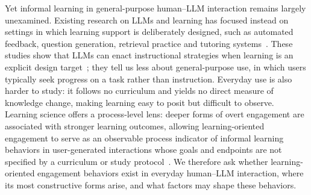 Yet informal learning in general-purpose human--LLM interaction remains largely unexamined. Existing research on LLMs and learning has focused instead on settings in which learning support is deliberately designed, such as automated feedback, question generation, retrieval practice and tutoring systems~\cite{kasneci2023chatgpt,meyer2024using,arif2024generation,jin2024teach,lim2024identify,yan2024promises,futterer2026learningcoach}. These studies show that LLMs can enact instructional strategies when learning is an explicit design target~\cite{terzimehic2026conversational,vanlehn2011relative}; they tell us less about general-purpose use, in which users typically seek progress on a task rather than instruction. Everyday use is also harder to study: it follows no curriculum and yields no direct measure of knowledge change, making learning easy to posit but difficult to observe. Learning science offers a process-level lens: deeper forms of overt engagement are associated with stronger learning outcomes, allowing learning-oriented engagement to serve as an observable process indicator of informal learning behaviors in user-generated interactions whose goals and endpoints are not specified by a curriculum or study protocol~\cite{fredricks2004school,chi2014icap,koedinger2007exploring}. We therefore ask whether learning-oriented engagement behaviors exist in everyday human--LLM interaction, where its most constructive forms arise, and what factors may shape these behaviors.






